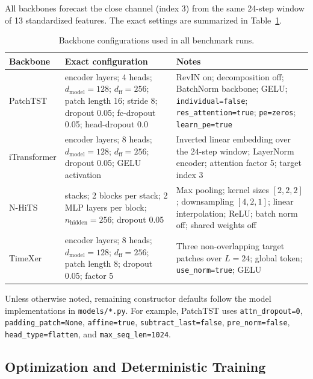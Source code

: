\documentclass[11pt]{article}
\begin{document}
All backbones forecast the close channel (index 3) from the same
24-step window of 13 standardized features. The exact settings are
summarized in Table~\ref{tab:architecture-config}.

\begin{table}[t]
\centering
\caption{Backbone configurations used in all benchmark runs.}
\label{tab:architecture-config}
\small
\begin{tabularx}{\textwidth}{l>{\raggedright\arraybackslash}X>{\raggedright\arraybackslash}X}
\toprule
Backbone & Exact configuration & Notes \\
\midrule
PatchTST & 3 encoder layers; 4 heads; $d_{\mathrm{model}} = 128$;
  $d_{\mathrm{ff}} = 256$; patch length 16; stride 8; dropout 0.05;
  fc-dropout 0.05; head-dropout 0.0 & RevIN on; decomposition off;
  BatchNorm backbone; GELU; \texttt{individual=false};
  \texttt{res\_attention=true}; \texttt{pe=zeros};
  \texttt{learn\_pe=true} \\
iTransformer & 3 encoder layers; 8 heads; $d_{\mathrm{model}} = 128$;
  $d_{\mathrm{ff}} = 256$; dropout 0.05; GELU activation & Inverted
  linear embedding over the 24-step window; LayerNorm encoder;
  attention factor 5; target index 3 \\
N-HiTS & 3 stacks; 2 blocks per stack; 2 MLP layers per block;
  $n_{\mathrm{hidden}} = 256$; dropout 0.05 & Max pooling; kernel
  sizes $[2,2,2]$; downsampling $[4,2,1]$; linear interpolation;
  ReLU; batch norm off; shared weights off \\
TimeXer & 2 encoder layers; 8 heads; $d_{\mathrm{model}} = 128$;
  $d_{\mathrm{ff}} = 256$; patch length 8; dropout 0.05; factor 5 &
  Three non-overlapping target patches over $L = 24$; global token;
  \texttt{use\_norm=true}; GELU \\
\bottomrule
\end{tabularx}
\end{table}

Unless otherwise noted, remaining constructor defaults follow the
model implementations in \texttt{models/*.py}. For example, PatchTST
uses \texttt{attn\_dropout=0}, \texttt{padding\_patch=None},
\texttt{affine=true}, \texttt{subtract\_last=false},
\texttt{pre\_norm=false}, \texttt{head\_type=flatten}, and
\texttt{max\_seq\_len=1024}.

\subsection{Optimization and Deterministic Training}
\end{document}
